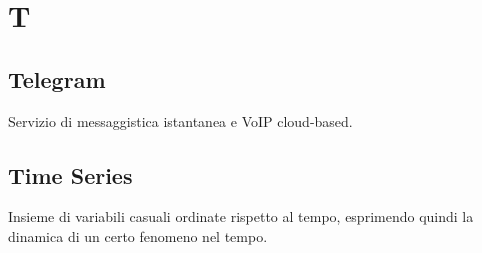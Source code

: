 \section*{T}
\subsection*{Telegram}
Servizio di messaggistica istantanea  e VoIP cloud-based.

\subsection*{Time Series}
Insieme di variabili casuali ordinate rispetto al tempo, esprimendo quindi la dinamica di un certo fenomeno nel tempo.

